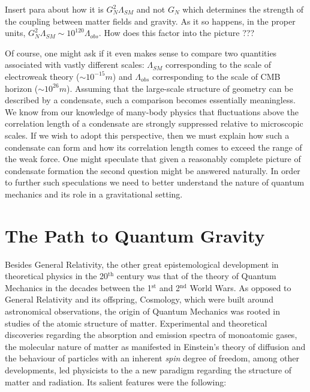 \documentclass[11pt,english,rmp]{revtex4}
\begin{document}
Insert para about how it is $G_{N}^{2}\Lambda_{SM}$ and not $G_{N}$
which determines the strength of the coupling between matter fields
and gravity. As it so happens, in the proper units, $G_{N}^{2}\Lambda_{SM}\sim10^{120}\Lambda_{obs}$.
How does this factor into the picture ???

Of course, one might ask if it even makes sense to compare two quantities
associated with vastly different scales: $\Lambda_{SM}$ corresponding
to the scale of electroweak theory ($\sim10^{-15}m$) and $\Lambda_{obs}$
corresponding to the scale of CMB horizon ($\sim10^{26}m$). Assuming
that the large-scale structure of geometry can be described by a condensate,
such a comparison becomes essentially meaningless. We know from our
knowledge of many-body physics that fluctuations above the correlation
length of a condensate are strongly suppressed relative to microscopic
scales. If we wish to adopt this perspective, then we must explain
how such a condensate can form and how its correlation length comes
to exceed the range of the weak force. One might speculate that given
a reasonably complete picture of condensate formation the second question
might be answered naturally. In order to further such speculations we need to better understand the nature of quantum mechanics and its role in a gravitational setting.

\section{The Path to Quantum Gravity}

Besides General Relativity, the other great epistemological development in theoretical physics in the 20$^{\textrm{th}}$ century was that of the theory of Quantum Mechanics in the decades between the 1$^{\textrm{st}}$ and 2$^{\textrm{nd}}$ World Wars. As opposed to General Relativity and its offspring, Cosmology, which were built around astronomical observations, the origin of Quantum Mechanics was rooted in studies of the atomic structure of matter. Experimental and theoretical discoveries regarding the absorption and emission spectra of monoatomic gases, the molecular nature of matter as manifested in Einstein's theory of diffusion and the behaviour of particles with an inherent \textit{spin} degree of freedom, among other developments, led physicists to the a new paradigm regarding the structure of matter and radiation. Its salient features were the following:
\end{document}

